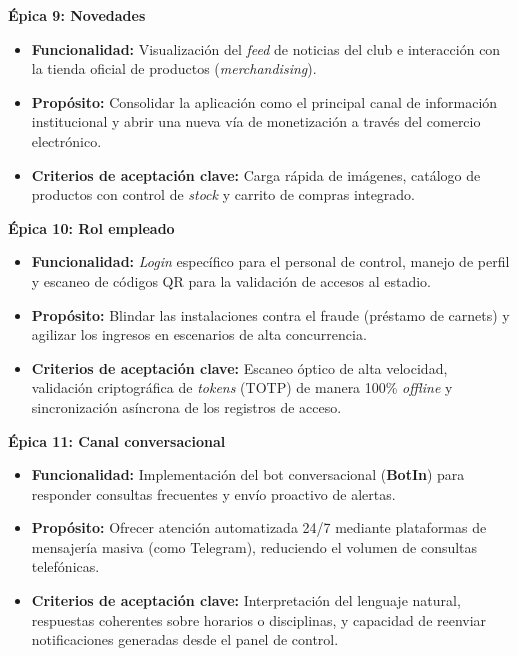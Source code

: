 \newpage

\textbf{Épica 9: Novedades}
\begin{itemize}
    \item \textbf{Funcionalidad:} Visualización del \textit{feed} de noticias del club e interacción con la tienda oficial de productos (\textit{merchandising}).
    \item \textbf{Propósito:} Consolidar la aplicación como el principal canal de información institucional y abrir una nueva vía de monetización a través del comercio electrónico.
    \item \textbf{Criterios de aceptación clave:} Carga rápida de imágenes, catálogo de productos con control de \textit{stock} y carrito de compras integrado.
\end{itemize}

\textbf{Épica 10: Rol empleado}
\begin{itemize}
    \item \textbf{Funcionalidad:} \textit{Login} específico para el personal de control, manejo de perfil y escaneo de códigos QR para la validación de accesos al estadio.
    \item \textbf{Propósito:} Blindar las instalaciones contra el fraude (préstamo de carnets) y agilizar los ingresos en escenarios de alta concurrencia.
    \item \textbf{Criterios de aceptación clave:} Escaneo óptico de alta velocidad, validación criptográfica de \textit{tokens} (TOTP) de manera 100\% \textit{offline} y sincronización asíncrona de los registros de acceso.
\end{itemize}

\textbf{Épica 11: Canal conversacional}
\begin{itemize}
    \item \textbf{Funcionalidad:} Implementación del bot conversacional (\textbf{BotIn}) para responder consultas frecuentes y envío proactivo de alertas.
    \item \textbf{Propósito:} Ofrecer atención automatizada 24/7 mediante plataformas de mensajería masiva (como Telegram), reduciendo el volumen de consultas telefónicas.
    \item \textbf{Criterios de aceptación clave:} Interpretación del lenguaje natural, respuestas coherentes sobre horarios o disciplinas, y capacidad de reenviar notificaciones generadas desde el panel de control.
\end{itemize}
